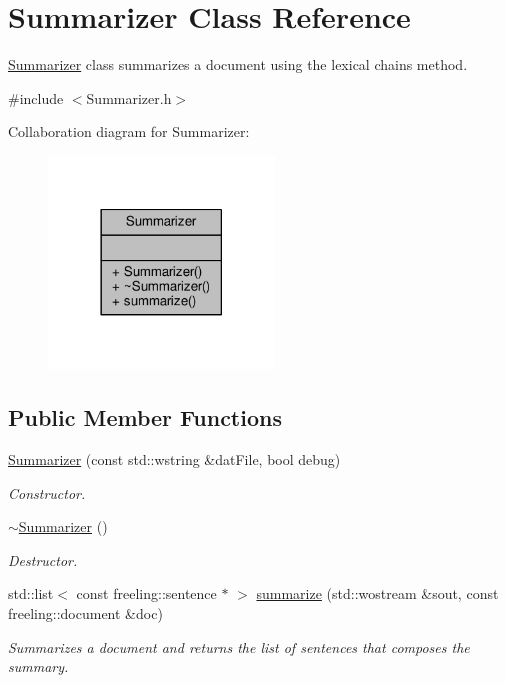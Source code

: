 \hypertarget{classSummarizer}{}\section{Summarizer Class Reference}
\label{classSummarizer}


\hyperlink{classSummarizer}{Summarizer} class summarizes a document using the lexical chains method.  




{\ttfamily \#include $<$Summarizer.\+h$>$}



Collaboration diagram for Summarizer\+:\nopagebreak
\begin{figure}[H]
\begin{center}
\leavevmode
\includegraphics[width=170pt]{classSummarizer__coll__graph}
\end{center}
\end{figure}
\subsection*{Public Member Functions}
\begin{DoxyCompactItemize}
\item 
\hyperlink{classSummarizer_ae24d5afc2f3c61a287379e2b614726ac}{Summarizer} (const std\+::wstring \&dat\+File, bool debug)
\begin{DoxyCompactList}\small\item\em Constructor. \end{DoxyCompactList}\item 
\hyperlink{classSummarizer_a787d7b2274aeb313acd19d150437d4f5}{$\sim$\+Summarizer} ()
\begin{DoxyCompactList}\small\item\em Destructor. \end{DoxyCompactList}\item 
std\+::list$<$ const freeling\+::sentence $\ast$ $>$ \hyperlink{classSummarizer_a70a36036e96b1b03175c3f1fdde9d0e1}{summarize} (std\+::wostream \&sout, const freeling\+::document \&doc)
\begin{DoxyCompactList}\small\item\em Summarizes a document and returns the list of sentences that composes the summary. \end{DoxyCompactList}\end{DoxyCompactItemize}



